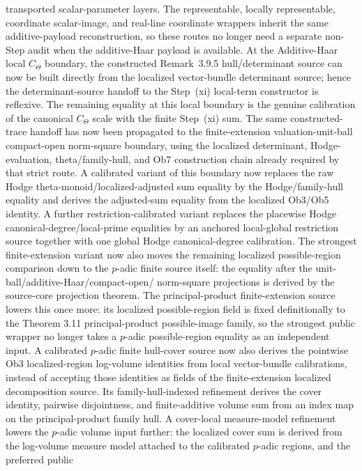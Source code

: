 \documentclass[11pt]{article}
\theoremstyle{plain}
\theoremstyle{definition}
\theoremstyle{remark}
\begin{document}
transported scalar-parameter layers.  The representable, locally representable,
coordinate scalar-image, and real-line coordinate wrappers inherit the same
additive-payload reconstruction, so these routes no longer need a separate
non-Step audit when the additive-Haar payload is available.  At the Additive-Haar
local \(C_\Theta\) boundary, the constructed Remark~3.9.5 hull/determinant
source can now be built directly from the localized vector-bundle determinant
source; hence the determinant-source handoff to the Step~(xi) local-term
constructor is reflexive.  The remaining equality at this local boundary is the
genuine calibration of the canonical \(C_\Theta\) scale with the finite
Step~(xi) sum.  The same constructed-trace handoff has now been propagated to
the finite-extension valuation-unit-ball
compact-open norm-square boundary, using the localized determinant,
Hodge-evaluation, theta/family-hull, and Ob7 construction chain already
required by that strict route.  A calibrated variant of this boundary now
replaces the raw Hodge theta-monoid/localized-adjusted sum equality by the
Hodge/family-hull equality and derives the adjusted-sum equality from the
localized Ob3/Ob5 identity.  A further restriction-calibrated variant replaces
the placewise Hodge canonical-degree/local-prime equalities by an anchored
local-global restriction source together with one global Hodge canonical-degree
calibration.  The strongest finite-extension variant now also moves the
remaining localized possible-region comparison down to the \(p\)-adic finite
source itself: the equality after the unit-ball/additive-Haar/compact-open/
norm-square projections is derived by the source-core projection theorem.
The principal-product finite-extension source lowers this once more: its
localized possible-region field is fixed definitionally to the Theorem 3.11
principal-product possible-image family, so the strongest public wrapper no
longer takes a \(p\)-adic possible-region equality as an independent input.
A calibrated \(p\)-adic finite hull-cover source now also derives the
pointwise Ob3 localized-region log-volume identities from local vector-bundle
calibrations, instead of accepting those identities as fields of the
finite-extension localized decomposition source.
Its family-hull-indexed refinement derives the cover identity, pairwise
disjointness, and finite-additive volume sum from an index map on the
principal-product family hull.
A cover-local measure-model refinement lowers the \(p\)-adic volume input
further: the localized cover sum is derived from the log-volume measure model
attached to the calibrated \(p\)-adic regions, and the preferred public
\end{document}
